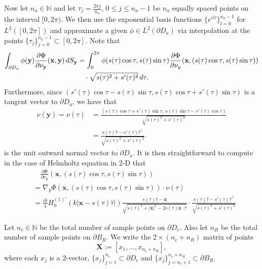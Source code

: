 \documentclass[11pt]{amsart}
\theoremstyle{definition}
\theoremstyle{definition}
\theoremstyle{definition}
\begin{document}
Now let $n_{a} \in \mathbb{N}$ and let $\tau_{j} = \frac{2\pi j}{n_{a}}$, $0 \leq j \leq n_{a}-1$ be $n_{a}$ equally spaced points on the interval $[0,2\pi)$. We then use the exponential basis functions $\{e^{il\tau}\}_{l=0}^{n_{a}-1}$ for $L^{2}([0,2\pi])$ and approximate a given $\phi \in L^{2}(\partial D_{a})$ via interpolation at the points $\{\tau_{j}\}_{j=0}^{n_{a}-1} \subset [0,2\pi]$. Note that
\begin{align}
\int_{\partial D_{a}}\phi(\mathbf{y}) \frac{\partial \Phi}{\partial \nu_{\mathbf{y}}}(\mathbf{x},\mathbf{y})\,dS_{\mathbf{y}} & = \int_{0}^{2\pi}\phi(s(\tau)\cos{\tau},s(\tau)\sin{\tau})\frac{\partial \Phi}{\partial \nu_{y}}(\mathbf{x}, (s(\tau)\cos{\tau},s(\tau)\sin{\tau})) \notag\\
& \quad \cdot \sqrt{s(\tau)^{2} + s'(\tau)^{2}}\,d\tau.
\end{align}
Furthermore, since $\left( s'(\tau)\cos{\tau} - s(\tau)\sin{\tau}, s(\tau)\cos{\tau} + s'(\tau)\sin{\tau}\right)$ is a tangent vector to $\partial D_{a}$, we have that
\begin{align*}
\nu(\mathbf{y}) = \nu(\tau) & = \frac{(s(\tau)\cos{\tau} + s'(\tau)\sin{\tau}, \, s(\tau)\sin{\tau} - s'(\tau)\cos{\tau})}{\sqrt{ s(\tau)^{2} + s'(\tau)^{2}}}\\
& = \frac{s(\tau)\widehat{\tau} - s'(\tau)\widehat{\tau}^{\perp}}{\sqrt{ s(\tau)^{2} + s'(\tau)^{2}}}.
\end{align*}
is the unit outward normal vector to $\partial D_{a}$. It is then straightforward to compute in the case of Helmholtz equation in 2-D that
\begin{align*}
& \quad \frac{\partial \Phi}{\partial \nu_{\mathbf{y}}}(\mathbf{x}, (s(\tau)\cos{\tau},s(\tau)\sin{\tau}))\\
& = \nabla_{y}\Phi(\mathbf{x}, (s(\tau)\cos{\tau}, s(\tau)\sin{\tau})) \cdot \nu(\tau)\\
& = \frac{ik}{4}H_{0}^{(1)'}(k|\mathbf{x} - s(\tau)\widehat{\tau}|)\frac{s(\tau)\widehat{\tau} - \mathbf{x}}{\sqrt{s(\tau)^{2} + |\mathbf{x}|^{2} - 2s(\tau)\mathbf{x}\cdot \widehat{\tau}}} \cdot \frac{s(\tau)\widehat{\tau} - s'(\tau)\widehat{\tau}^{\perp}}{\sqrt{s(\tau)^{2} + s'(\tau)^{2}}}
\end{align*}

Let $n_{c} \in \mathbb{N}$ be the total number of sample points on $\partial D_{c}$. Also let $n_{R}$ be the total number of sample points on $\partial B_{R}$. We write the $2 \times (n_{c} + n_{R})$ matrix of points
\begin{equation*}
\mathbf{X} := [x_{1}, \ldots, x_{n_{c}+n_{R}}],
\end{equation*}
where each $x_{j}$ is a $2$-vector, $\{x_{j}\}_{j=1}^{n_{c}} \subset \partial D_{c}$ and $\{x_{j}\}_{j=n_{c}+1}^{n_{c} + n_{R}} \subset \partial B_{R}$. 
\end{document}
